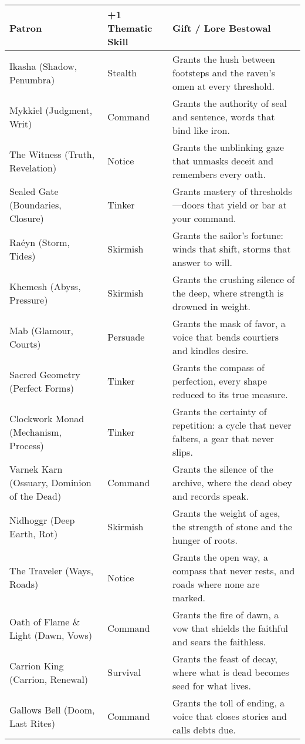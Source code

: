 \begin{tabular}{@{}p{3.8cm}p{3.8cm}p{7.5cm}@{}}
\toprule
\textbf{Patron} & \textbf{+1 Thematic Skill} & \textbf{Gift / Lore Bestowal} \\
\midrule
Ikasha (Shadow, Penumbra) & Stealth & Grants the hush between footsteps and the raven’s omen at every threshold. \\
Mykkiel (Judgment, Writ) & Command & Grants the authority of seal and sentence, words that bind like iron. \\
The Witness (Truth, Revelation) & Notice & Grants the unblinking gaze that unmasks deceit and remembers every oath. \\
Sealed Gate (Boundaries, Closure) & Tinker & Grants mastery of thresholds—doors that yield or bar at your command. \\
Raéyn (Storm, Tides) & Skirmish & Grants the sailor’s fortune: winds that shift, storms that answer to will. \\
Khemesh (Abyss, Pressure) & Skirmish & Grants the crushing silence of the deep, where strength is drowned in weight. \\
Mab (Glamour, Courts) & Persuade & Grants the mask of favor, a voice that bends courtiers and kindles desire. \\
Sacred Geometry (Perfect Forms) & Tinker & Grants the compass of perfection, every shape reduced to its true measure. \\
Clockwork Monad (Mechanism, Process) & Tinker & Grants the certainty of repetition: a cycle that never falters, a gear that never slips. \\
Varnek Karn (Ossuary, Dominion of the Dead) & Command & Grants the silence of the archive, where the dead obey and records speak. \\
Nidhoggr (Deep Earth, Rot) & Skirmish & Grants the weight of ages, the strength of stone and the hunger of roots. \\
The Traveler (Ways, Roads) & Notice & Grants the open way, a compass that never rests, and roads where none are marked. \\
Oath of Flame \& Light (Dawn, Vows) & Command & Grants the fire of dawn, a vow that shields the faithful and sears the faithless. \\
Carrion King (Carrion, Renewal) & Survival & Grants the feast of decay, where what is dead becomes seed for what lives. \\
Gallows Bell (Doom, Last Rites) & Command & Grants the toll of ending, a voice that closes stories and calls debts due. \\

\end{tabular}

